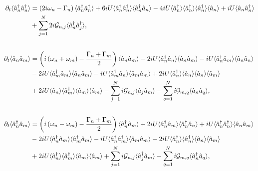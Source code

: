 \begin{adjustwidth}{-3cm}{0cm}
\begin{align}
%
%
%
%
\partial_t\langle\hat{a}_n^\dagger\hat{a}_n^\dagger\rangle &= \left(2 i \omega_n - \Gamma_n  \right) \langle\hat{a}_n^\dagger\hat{a}_n^\dagger\rangle + 6 i U \langle\hat{a}_n^\dagger\hat{a}_n^\dagger\rangle\langle\hat{a}_n^\dagger \hat{a}_n\rangle - 4 i U \langle\hat{a}_n^\dagger\rangle\langle\hat{a}_n^\dagger\rangle\langle\hat{a}_n^\dagger\rangle\langle\hat{a}_n\rangle + i U \langle\hat{a}_n\hat{a}^\dagger_n\rangle  \notag \\
&+ \sum_{j=1}^N 2 i \mathcal{G}_{n, j} \langle\hat{a}_n^\dagger\hat{a}_j^\dagger\rangle, \notag \\[18pt]
%
%
\partial_t\langle\hat{a}_n\hat{a}_m\rangle &= \left(i\left(\omega_n + \omega_m\right) - \frac{\Gamma_n + \Gamma_m}{2}\right)\langle\hat{a}_n\hat{a}_m\rangle - 2 i U \langle\hat{a}_n^\dagger\hat{a}_n\rangle \langle\hat{a}_n\hat{a}_m\rangle - i U \langle\hat{a}_n^\dagger\hat{a}_m\rangle \langle\hat{a}_n\hat{a}_n\rangle \notag \\
& - 2 i U \langle\hat{a}_m^\dagger\hat{a}_m\rangle\langle\hat{a}_n\hat{a}_m\rangle - i U \langle\hat{a}_m^\dagger\hat{a}_n\rangle\langle\hat{a}_m\hat{a}_m\rangle + 2 i U \langle\hat{a}_n^\dagger\rangle \langle\hat{a}_n\rangle \langle\hat{a}_n\rangle \langle\hat{a}_m\rangle \notag \\
&+ 2 i U \langle\hat{a}_n\rangle \langle\hat{a}_m^\dagger\rangle \langle\hat{a}_m\rangle\langle\hat{a}_m\rangle %
 - \sum_{j=1}^N i \mathcal{G}_{n, j}\langle\hat{a}_j\hat{a}_m\rangle - \sum_{q=1}^N i \mathcal{G}_{m, q} \langle\hat{a}_n\hat{a}_q\rangle, \notag \\[18pt]
%
%
\partial_t\langle\hat{a}_n^\dagger\hat{a}_m\rangle &= \left(i\left(\omega_n - \omega_m\right) - \frac{\Gamma_n + \Gamma_m}{2}\right)\langle\hat{a}_n^\dagger\hat{a}_m\rangle + 2 i U \langle\hat{a}_n^\dagger\hat{a}_m \rangle \langle\hat{a}_n^\dagger \hat{a}_n\rangle + i U \langle \hat{a}_n^\dagger \hat{a}_n^\dagger\rangle\langle\hat{a}_n\hat{a}_m\rangle \notag \\
& - 2 i U \langle\hat{a}_n^\dagger \hat{a}_m \rangle \langle \hat{a}_m^\dagger \hat{a}_m\rangle - i U \langle\hat{a}_n^\dagger \hat{a}_m^\dagger\rangle \langle\hat{a}_m\hat{a}_m\rangle - 2 i U \langle\hat{a}_n^\dagger\rangle \langle\hat{a}_n^\dagger\rangle \langle\hat{a}_n\rangle \langle\hat{a}_m\rangle \notag \\
&+ 2 i U \langle\hat{a}_n^\dagger \rangle \langle \hat{a}_m^\dagger \rangle \langle \hat{a}_m\rangle \langle\hat{a}_m\rangle %
 + \sum_{j=1}^N i \mathcal{G}_{n, j}\langle\hat{a}_j^\dagger\hat{a}_m\rangle - \sum_{q=1}^N i \mathcal{G}_{m, q}\langle \hat{a}_n^\dagger \hat{a}_q\rangle,  \notag %
%
\end{align}
\endgroup
\end{adjustwidth}
